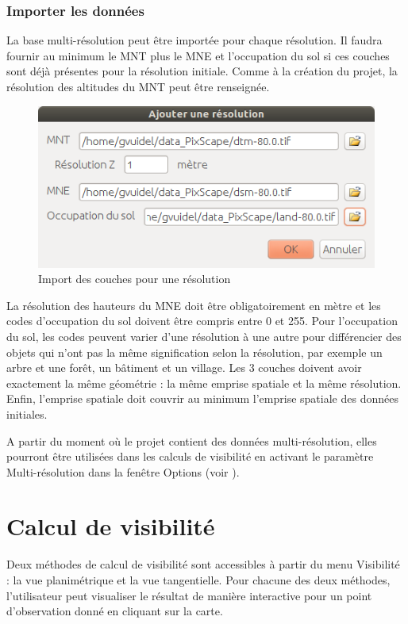 \documentclass{report}
\begin{document}
\subsubsection{Importer les données}
La base multi-résolution peut être importée pour chaque résolution. Il faudra fournir au minimum le MNT plus le MNE et l'occupation du sol si ces couches sont déjà présentes pour la résolution initiale. Comme à la création du projet, la résolution des altitudes du MNT peut être renseignée. 

\begin{figure}[H]
	\includegraphics[scale=0.5]{img/add_scale-fr.png} 
	\caption{Import des couches pour une résolution}
\end{figure}

La résolution des hauteurs du MNE doit être obligatoirement en mètre et les codes d'occupation du sol doivent être compris entre 0 et 255. Pour l'occupation du sol, les codes peuvent varier d'une résolution à une autre pour différencier des objets qui n'ont pas la même signification selon la résolution, par exemple un arbre et une forêt, un bâtiment et un village.  
Les 3 couches doivent avoir exactement la même géométrie : la même emprise spatiale et la même résolution.
Enfin, l'emprise spatiale doit couvrir au minimum l'emprise spatiale des données initiales. 

A partir du moment où le projet contient des données multi-résolution, elles pourront être utilisées dans les calculs de visibilité en activant le paramètre Multi-résolution dans la fenêtre Options (voir ). 

\section{Calcul de visibilité}

Deux méthodes de calcul de visibilité sont accessibles à partir du menu Visibilité : la vue planimétrique et la vue tangentielle.
Pour chacune des deux méthodes, l'utilisateur peut visualiser le résultat de manière interactive pour un point d'observation donné en cliquant sur la carte.
\end{document}
